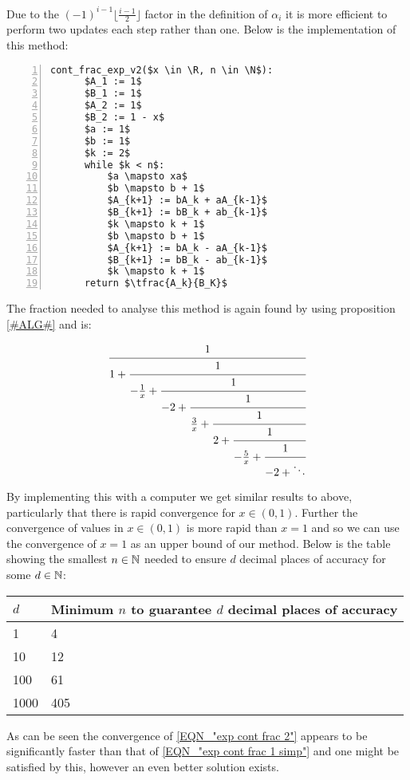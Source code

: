 Due to the \((-1)^{i-1}\lfloor\frac{i-1}{2}\rfloor\) factor in the definition of \(\alpha_i\) it is more efficient to perform two updates each step rather than one. Below is the implementation of this method:

\begin{lstlisting}[numbers=left,frame=single,mathescape,caption={Continued fraction for \(e^x\) version 2},label={PCD_"cont exp v2"}]
  cont_frac_exp_v2($x \in \R, n \in \N$):
      $A_1 := 1$
      $B_1 := 1$
      $A_2 := 1$
      $B_2 := 1 - x$
      $a := 1$
      $b := 1$
      $k := 2$
      while $k < n$:
          $a \mapsto xa$
          $b \mapsto b + 1$
          $A_{k+1} := bA_k + aA_{k-1}$
          $B_{k+1} := bB_k + ab_{k-1}$
          $k \mapsto k + 1$
          $b \mapsto b + 1$
          $A_{k+1} := bA_k - aA_{k-1}$
          $B_{k+1} := bB_k - ab_{k-1}$
          $k \mapsto k + 1$
      return $\tfrac{A_k}{B_K}$
\end{lstlisting}

The fraction needed to analyse this method is again found by using proposition \ref{#ALG#} and is:

\begin{displaymath}
	\cfrac{1}{1 +
	\cfrac{1}{-\frac{1}{x} +
	\cfrac{1}{-2 + 
	\cfrac{1}{\frac{3}{x} +
	\cfrac{1}{2 + 
	\cfrac{1}{-\frac{5}{x} +
	\cfrac{1}{-2 + \ddots} } } } } } }
\end{displaymath}

By implementing this with a computer we get similar results to above, particularly that there is rapid convergence for \(x \in (0, 1)\). Further the convergence of values in \(x \in (0,1)\) is more rapid than \(x = 1\) and so we can use the convergence of \(x = 1\) as an upper bound of our method. Below is the table showing the smallest \(n \in \mathbb{N}\) needed to ensure \(d\) decimal places of accuracy for some \(d \in \mathbb{N}\):

\begin{center}
\begin{tabular}{|l|l|}
\hline
\(d\) & Minimum \(n\) to guarantee \(d\) decimal places of accuracy\\\hline
1 & 4 \\\hline
10 & 12 \\\hline
100 & 61 \\\hline
1000 & 405 \\\hline
\end{tabular}
\end{center}

As can be seen the convergence of \ref{EQN_"exp cont frac 2"} appears to be significantly faster than that of \ref{EQN_"exp cont frac 1 simp"} and one might be satisfied by this, however an even better solution exists.\\

